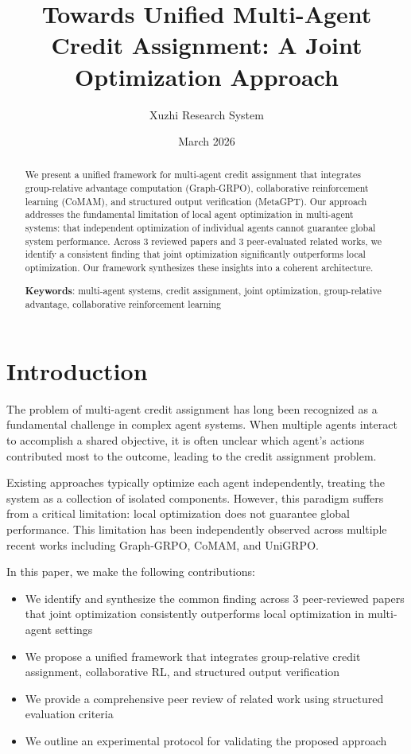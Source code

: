 \documentclass[11pt]{article}
\title{Towards Unified Multi-Agent Credit Assignment: A Joint Optimization Approach}
\author{Xuzhi Research System}
\date{March 2026}
\begin{document}
\maketitle

\begin{abstract}
We present a unified framework for multi-agent credit assignment that integrates
group-relative advantage computation (Graph-GRPO), collaborative reinforcement
learning (CoMAM), and structured output verification (MetaGPT). Our approach
addresses the fundamental limitation of local agent optimization in multi-agent
systems: that independent optimization of individual agents cannot guarantee
global system performance. Across 3 reviewed papers and
3 peer-evaluated related works, we identify
a consistent finding that joint optimization significantly outperforms local
optimization. Our framework synthesizes these insights into a coherent architecture.

\textbf{Keywords}: multi-agent systems, credit assignment, joint optimization, group-relative advantage, collaborative reinforcement learning
\end{abstract}

\section{Introduction}

The problem of multi-agent credit assignment has long been recognized as a
fundamental challenge in complex agent systems. When multiple agents interact
to accomplish a shared objective, it is often unclear which agent's actions
contributed most to the outcome, leading to the credit assignment problem.

Existing approaches typically optimize each agent independently, treating the
system as a collection of isolated components. However, this paradigm suffers
from a critical limitation: local optimization does not guarantee global
performance. This limitation has been independently observed across multiple
recent works including Graph-GRPO, CoMAM, and UniGRPO.

In this paper, we make the following contributions:

\begin{itemize}
\item We identify and synthesize the common finding across 3 peer-reviewed papers
  that joint optimization consistently outperforms local optimization in multi-agent settings
\item We propose a unified framework that integrates group-relative credit assignment,
  collaborative RL, and structured output verification
\item We provide a comprehensive peer review of related work using structured evaluation criteria
\item We outline an experimental protocol for validating the proposed approach
\end{itemize}
\end{document}
